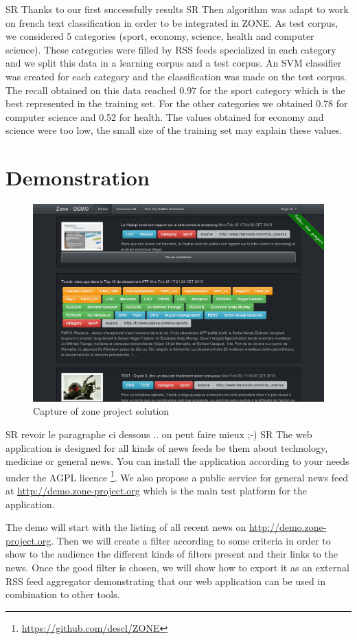 \documentclass{llncs}
\begin{document}
SR Thanks to our first successfully results SR Then algorithm was adapt to work on french text classification in order to be integrated in ZONE. As test corpus, we considered 5 categories (sport, economy, science, health and computer science). These categories were filled by RSS feeds specialized in each category and we split this data in a learning corpus and a test corpus. An SVM classifier was created for each category and the classification was made on the test corpus. The recall obtained on this data reached 0.97 for the sport category which is the best represented in the training set. For the other categories we obtained 0.78 for computer science and 0.52 for health. The values obtained for economy and science were too low, the small size of the training set may explain these values.

\section{Demonstration}
%
\begin{figure}[h]
	\includegraphics[width=0.5\columnwidth]{zone-screenshot.png}
	\caption{Capture of zone project solution}
	\label{fig:DEMO}
\end{figure}

SR revoir le paragraphe ci dessous .. on peut faire mieux ;-) SR
The web application is designed for all kinds of news feeds be them about technology, medicine or general news. You can install the application according to your needs under the AGPL licence \footnote{\url{https://github.com/descl/ZONE}}. We also propose a public service for general news feed at \url{http://demo.zone-project.org} which is the main test platform for the application.

The demo will start with the listing of all recent news on \url{http://demo.zone-project.org}. Then we will create a filter according to some criteria in order to show to the audience the different kinds of filters present and their links to the news. Once the good filter is chosen, we will show how to export it as an external RSS feed aggregator demonstrating that our web application can be used in combination to other tools.
\end{document}
